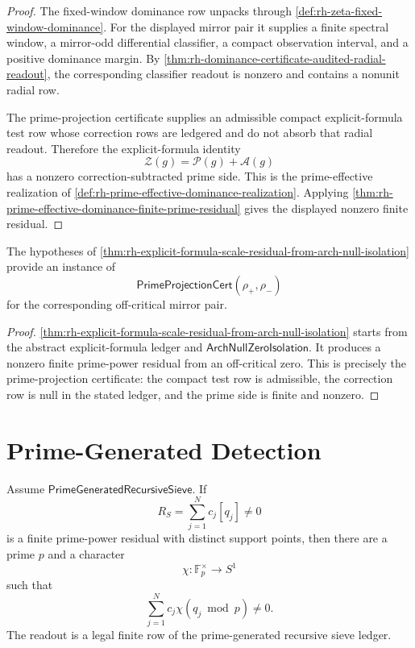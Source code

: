 \begin{proof}
The fixed-window dominance row unpacks through
\autoref{def:rh-zeta-fixed-window-dominance}.  For the displayed mirror
pair it supplies a finite spectral window, a mirror-odd differential
classifier, a compact observation interval, and a positive dominance
margin.  By
\autoref{thm:rh-dominance-certificate-audited-radial-readout}, the
corresponding classifier readout is nonzero and contains a nonunit
radial row.

The prime-projection certificate supplies an admissible compact
explicit-formula test row whose correction rows are ledgered and do not
absorb that radial readout.  Therefore the explicit-formula identity
$$
\mathcal Z(g)=\mathcal P(g)+\mathcal A(g)
$$
has a nonzero correction-subtracted prime side.  This is the
prime-effective realization of
\autoref{def:rh-prime-effective-dominance-realization}.  Applying
\autoref{thm:rh-prime-effective-dominance-finite-prime-residual} gives
the displayed nonzero finite residual.
\end{proof}

\begin{corollary}
\label{cor:rh-explicit-formula-isolation-prime-projection-cert}
The hypotheses of
\autoref{thm:rh-explicit-formula-scale-residual-from-arch-null-isolation}
provide an instance of
$$
\mathsf{PrimeProjectionCert}(\rho_+,\rho_-)
$$
for the corresponding off-critical mirror pair.
\end{corollary}

\begin{proof}
\autoref{thm:rh-explicit-formula-scale-residual-from-arch-null-isolation}
starts from the abstract explicit-formula ledger and
$\mathsf{ArchNullZeroIsolation}$.  It produces a nonzero finite
prime-power residual from an off-critical zero.  This is precisely the
prime-projection certificate: the compact test row is admissible, the
correction row is null in the stated ledger, and the prime side is
finite and nonzero.
\end{proof}

\section{Prime-Generated Detection}
\label{sec:rh-offline-zero-prime-sieve-detection}

\begin{theorem}
\label{thm:rh-finite-residual-enters-prime-generated-sieve}
Assume $\mathsf{PrimeGeneratedRecursiveSieve}$.  If
$$
R_S=\sum_{j=1}^{N}c_j[q_j]\ne0
$$
is a finite prime-power residual with distinct support points, then
there are a prime $p$ and a character
$$
\chi:\mathbb F_p^\times\to S^1
$$
such that
$$
\sum_{j=1}^{N}c_j\chi(q_j\bmod p)\ne0.
$$
The readout is a legal finite row of the prime-generated recursive
sieve ledger.
\end{theorem}

